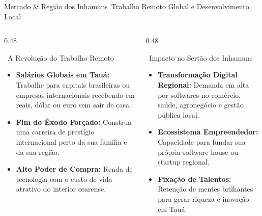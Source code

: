 \begin{frame}{Mercado \& Região dos Inhamuns}{\faGlobeAmericas\ Trabalho Remoto Global e Desenvolvimento Local}
  \begin{columns}[t]
    \begin{column}{0.48\textwidth}
      \begin{bluecard}{\faHome\ A Revolução do Trabalho Remoto}
        \begin{itemize}\setlength{\itemsep}{0.25em}\footnotesize
          \item \textbf{Salários Globais em Tauá:} Trabalhe para capitais brasileiras ou empresas internacionais recebendo em reais, dólar ou euro sem sair de casa.
          \item \textbf{Fim do Êxodo Forçado:} Construa uma carreira de prestígio internacional perto da sua família e da sua região.
          \item \textbf{Alto Poder de Compra:} Renda de tecnologia com o custo de vida atrativo do interior cearense.
        \end{itemize}
      \end{bluecard}
    \end{column}
    
    \begin{column}{0.48\textwidth}
      \begin{greencard}{\faSeedling\ Impacto no Sertão dos Inhamuns}
        \begin{itemize}\setlength{\itemsep}{0.25em}\footnotesize
          \item \textbf{Transformação Digital Regional:} Demanda em alta por softwares no comércio, saúde, agronegócio e gestão pública local.
          \item \textbf{Ecossistema Empreendedor:} Capacidade para fundar sua própria software house ou startup regional.
          \item \textbf{Fixação de Talentos:} Retenção de mentes brilhantes para gerar riqueza e inovação em Tauá.
        \end{itemize}
      \end{greencard}
    \end{column}
  \end{columns}
\end{frame}
